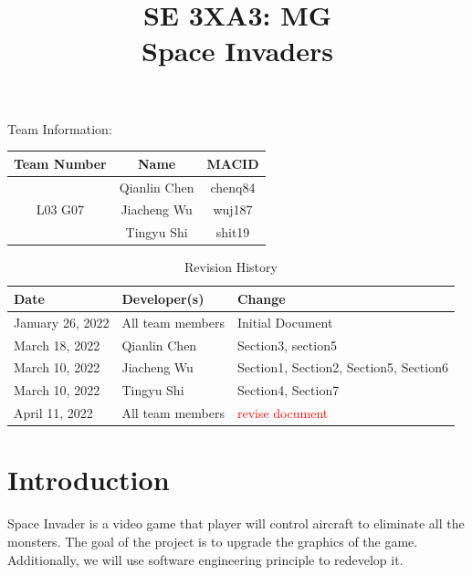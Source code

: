 \documentclass[12pt]{article}
\title{SE 3XA3: MG\\Space Invaders}
\begin{document}
\maketitle

{\Large Team Information:}
\begin{table}[htp]
\centering
{\Large
\begin{tabular}{|c|c|c|}
\hline
\multicolumn{1}{|l|}{Team Number} & Name         & MACID   \\ \hline
\multirow{3}{*}{L03 G07}          & Qianlin Chen & chenq84 \\ \cline{2-3} 
                                  & Jiacheng Wu  & wuj187  \\ \cline{2-3} 
                                  & Tingyu Shi   & shit19  \\ \hline
\end{tabular}
}
\end{table}

\newpage
\begin{table}[htp]
\caption{Revision History} 
\begin{tabularx}{\textwidth}{llX}
\toprule
\textbf{Date} & \textbf{Developer(s)} & \textbf{Change}\\
\midrule
January 26, 2022 & All team members & Initial Document\\
March 18, 2022 & Qianlin Chen & Section3, section5\\
March 10, 2022 & Jiacheng Wu & Section1, Section2, Section5, Section6\\
March 10, 2022 & Tingyu Shi & Section4, Section7\\
April 11, 2022 & All team members & \textcolor{red}{revise document}\\
\bottomrule
\end{tabularx}
\end{table}
\newpage
\tableofcontents
\listoftables
\listoffigures
\cleardoublepage

\section{Introduction}
Space Invader is a video game that player will control aircraft to eliminate all the monsters. The goal of the project is to upgrade the graphics of the game. Additionally, we will use software engineering principle to redevelop it.
\end{document}

